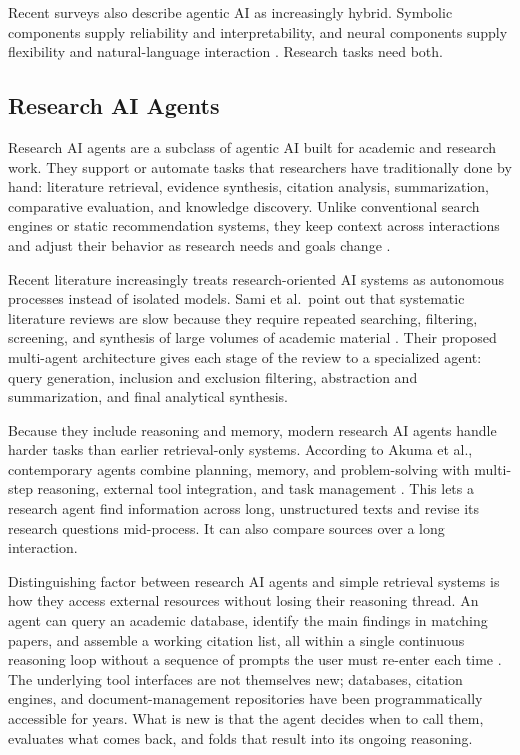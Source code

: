 \documentclass[sn-basic,Numbered]{sn-jnl}
\begin{document}
Recent surveys also describe agentic AI as increasingly hybrid.
Symbolic components supply reliability and interpretability, and neural
components supply flexibility and natural-language interaction
\cite{deshmukh2025agentic,patil2025agenticaction}. Research tasks need
both.

\subsection{Research AI Agents}

Research AI agents are a subclass of agentic AI built for academic and
research work. They support or automate tasks that researchers have
traditionally done by hand: literature retrieval, evidence synthesis,
citation analysis, summarization, comparative evaluation, and knowledge
discovery. Unlike conventional search engines or static recommendation
systems, they keep context across interactions and adjust their behavior
as research needs and goals change \cite{acharya2025agentic,sami2025slr}.

Recent literature increasingly treats research-oriented AI systems as
autonomous processes instead of isolated models. Sami et al.\ point out
that systematic literature reviews are slow because they require
repeated searching, filtering, screening, and synthesis of large
volumes of academic material \cite{sami2025slr}. Their proposed
multi-agent architecture gives each stage of the review to a specialized
agent: query generation, inclusion and exclusion filtering, abstraction
and summarization, and final analytical synthesis.

Because they include reasoning and memory, modern research AI agents
handle harder tasks than earlier retrieval-only systems. According to
Akuma et al., contemporary agents combine planning, memory, and
problem-solving with multi-step reasoning, external tool integration,
and task management \cite{akuma2025agents}. This lets a research agent
find information across long, unstructured texts and revise its research
questions mid-process. It can also compare sources over a long
interaction.

Distinguishing factor between research AI agents and simple retrieval systems is
how they access external resources without losing their reasoning
thread. An agent can query an academic database, identify the main
findings in matching papers, and assemble a working citation list, all
within a single continuous reasoning loop without a sequence of
prompts the user must re-enter each time
\cite{deshmukh2025agentic,acharya2025agentic}. The underlying tool
interfaces are not themselves new; databases, citation engines, and
document-management repositories have been programmatically accessible
for years. What is new is that the agent decides when to call them,
evaluates what comes back, and folds that result into its ongoing
reasoning.
\end{document}
